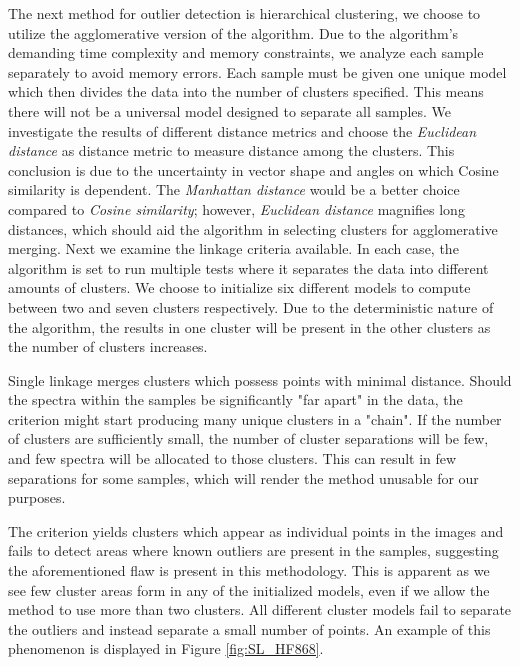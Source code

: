 The next method for outlier detection is hierarchical clustering, we choose to utilize the agglomerative version of the algorithm. Due to the algorithm's demanding time complexity and memory constraints, we analyze each sample separately to avoid memory errors. Each sample must be given one unique model which then divides the data into  the number of clusters specified. This means there will not be a universal model designed to separate all samples. We investigate the results of different distance metrics and choose the \textit{Euclidean distance} as distance metric to measure distance among the clusters. This conclusion is due to the uncertainty in vector shape and angles on which Cosine similarity is dependent. The \textit{Manhattan distance} would be a better choice compared to \textit{Cosine similarity}; however, \textit{Euclidean distance} magnifies long distances, which should aid the algorithm in selecting clusters for agglomerative merging. Next we examine the linkage criteria available. In each case, the algorithm is set to run multiple tests where it separates the data into different amounts of clusters. We choose to initialize six different models to compute between two and seven clusters respectively. Due to the deterministic nature of the algorithm, the results in one cluster will be present in the other clusters as the number of clusters increases.

Single linkage merges clusters which possess points with minimal distance. Should the spectra within the samples be significantly "far apart" in the data, the criterion might start producing many unique clusters in a "chain". If the number of clusters are sufficiently small, the number of cluster separations will be few, and few spectra will be allocated to those clusters. This can result in few separations for some samples, which will render the method unusable for our purposes.

The criterion yields clusters which appear as individual points in the images and fails to detect areas where known outliers are present in the samples, suggesting the aforementioned flaw is present in this methodology. This is apparent as we see few cluster areas form in any of the initialized models, even if we allow the method to use more than two clusters. All different cluster models fail to separate the outliers and instead separate a small number of points. An example of this phenomenon is displayed in Figure \ref{fig:SL_HF868}.

